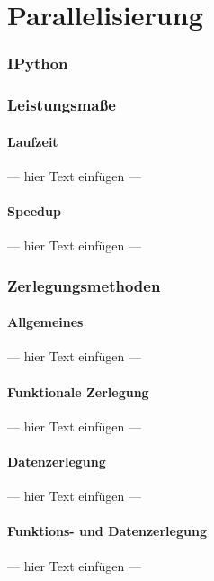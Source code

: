 \documentclass[a4paper, 12pt]{article}
\begin{document}
\part{Parallelisierung}



\section{IPython}



\section{Leistungsmaße}


\subsection{Laufzeit}
--- hier Text einfügen ---


\subsection{Speedup}
--- hier Text einfügen ---



\section{Zerlegungsmethoden}


\subsection{Allgemeines}
--- hier Text einfügen ---


\subsection{Funktionale Zerlegung}
--- hier Text einfügen ---


\subsection{Datenzerlegung}
--- hier Text einfügen ---


\subsection{Funktions- und Datenzerlegung}
--- hier Text einfügen ---
\end{document}
